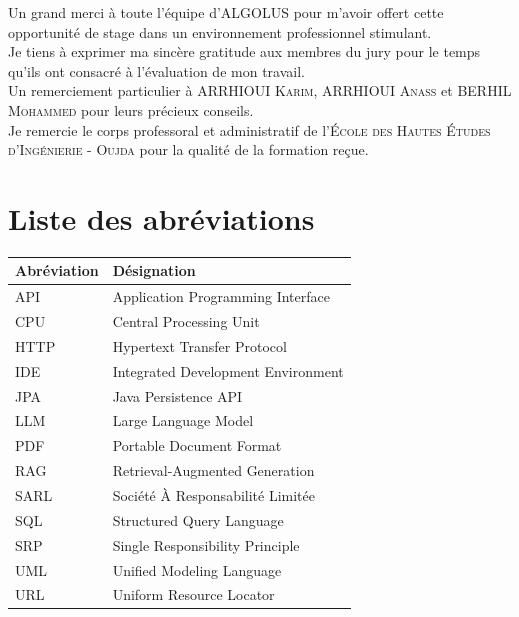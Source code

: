 \documentclass[12pt,a4paper]{report}
\begin{document}
	Un grand merci à toute l'équipe d'\textsc{ALGOLUS} pour m'avoir offert cette opportunité de stage dans un environnement professionnel stimulant.\\[0.6em]
	
	Je tiens à exprimer ma sincère gratitude aux membres du jury pour le temps qu’ils ont consacré à l’évaluation de mon travail.\\[0.6em]
	
	Un remerciement particulier à \textsc{ARRHIOUI Karim}, \textsc{ARRHIOUI Anass} et \textsc{BERHIL Mohammed} pour leurs précieux conseils.\\[0.6em]
			
	Je remercie le corps professoral et administratif de l'\textsc{École des Hautes Études d'Ingénierie - Oujda} pour la qualité de la formation reçue.
	\thispagestyle{empty}
	
	\chapter*{Liste des abréviations}
	
	\begin{table}[H]
		\centering
		\begin{tabular}{|l|l|}
			\hline
			\textbf{Abréviation} & \textbf{Désignation} \\
			\hline
			API & Application Programming Interface \\
			\hline
			CPU & Central Processing Unit \\
			\hline
			HTTP & Hypertext Transfer Protocol \\
			\hline
			IDE & Integrated Development Environment \\
			\hline
			JPA & Java Persistence API \\
			\hline
			LLM & Large Language Model \\
			\hline
			PDF & Portable Document Format \\
			\hline
			RAG & Retrieval-Augmented Generation \\
			\hline
			SARL & Société À Responsabilité Limitée \\
			\hline
			SQL & Structured Query Language \\
			\hline
			SRP & Single Responsibility Principle \\
			\hline
			UML & Unified Modeling Language \\
			\hline
			URL & Uniform Resource Locator \\
			\hline
		\end{tabular}
		\label{tab:liste-abréviations}
	\end{table}
	
\end{document}
